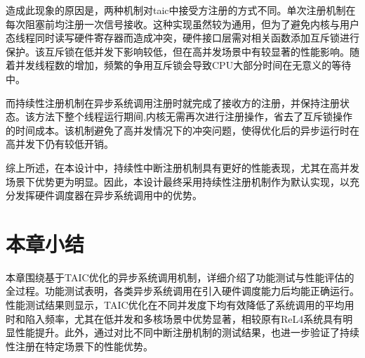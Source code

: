 造成此现象的原因是，两种机制对taic中接受方注册的方式不同。单次注册机制在每次阻塞前均注册一次信号接收。这种实现虽然较为通用，但为了避免内核与用户态线程同时读写硬件寄存器而造成冲突，硬件接口层需对相关函数添加互斥锁进行保护。该互斥锁在低并发下影响较低，但在高并发场景中有较显著的性能影响。随着并发线程数的增加，频繁的争用互斥锁会导致CPU大部分时间在无意义的等待中。

而持续性注册机制在异步系统调用注册时就完成了接收方的注册，并保持注册状态。该方法下整个线程运行期间,内核无需再次进行注册操作，省去了互斥锁操作的时间成本。该机制避免了高并发情况下的冲突问题，使得优化后的异步运行时在高并发下仍有较低开销。

综上所述，在本设计中，持续性中断注册机制具有更好的性能表现，尤其在高并发场景下优势更为明显。因此，本设计最终采用持续性注册机制作为默认实现，以充分发挥硬件调度器在异步系统调用中的优势。

\section{本章小结}

本章围绕基于TAIC优化的异步系统调用机制，详细介绍了功能测试与性能评估的全过程。功能测试表明，各类异步系统调用在引入硬件调度能力后均能正确运行。性能测试结果则显示，TAIC优化在不同并发度下均有效降低了系统调用的平均用时和陷入频率，尤其在低并发和多核场景中优势显著，相较原有ReL4系统具有明显性能提升。此外，通过对比不同中断注册机制的测试结果，也进一步验证了持续性注册在特定场景下的性能优势。

